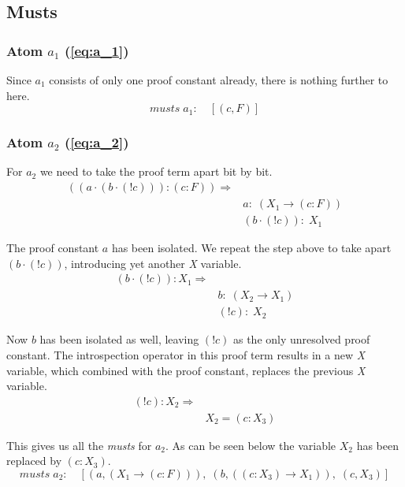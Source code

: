 \subsection{Musts}
\subsubsection[First atom]{Atom $a_1$ (\ref{eq:a_1})}
Since $a_1$ consists of only one proof constant already, there is nothing further to here.
\begin{equation}
	musts \; a_1:\quad  [(c, F)]
\end{equation}
\subsubsection[Second atom]{Atom $a_2$ (\ref{eq:a_2})}
For $a_2$ we need to take the proof term apart bit by bit.
\begin{align}\label{eq:musts1_a_2}
		((a \cdot(b\cdot (! c))):(c:F)) \Rightarrow \nonumber\\
		 & a : \; (X_1 \rightarrow (c:F)) \nonumber\\
		 & (b\cdot(! c)): \; X_1
\end{align}

The proof constant $a$ has been isolated. We repeat the step above to take apart $(b\cdot(! c))$, introducing yet another \emph{X} variable.
\begin{align}
	(b\cdot(! c)): X_1 \Rightarrow  \nonumber\\
	& b : \; (X_2 \rightarrow X_1) \nonumber\\
	& (! c) :\;  X_2
\end{align}

Now $b$ has been isolated as well, leaving $(! c)$ as the only unresolved proof constant. The introspection operator in this proof term results in a new \emph{X} variable, which combined with the proof constant, replaces the previous \emph{X} variable.
\begin{equation*}
	\begin{split}
		(! c) : X_2 \Rightarrow \\
		& X_2 = (c:X_3)
	\end{split}	
\end{equation*}

This gives us all the \emph{musts} for $a_2$. As can be seen below the variable $X_2$ has been replaced by $(c:X_3)$.
\begin{equation}\label{eq:a2_musts}
	musts \; a_2: \quad [(a, (X_1 \rightarrow (c:F))), \;(b, ((c:X_3) \rightarrow X_1)),\; (c, X_3)]
\end{equation}

